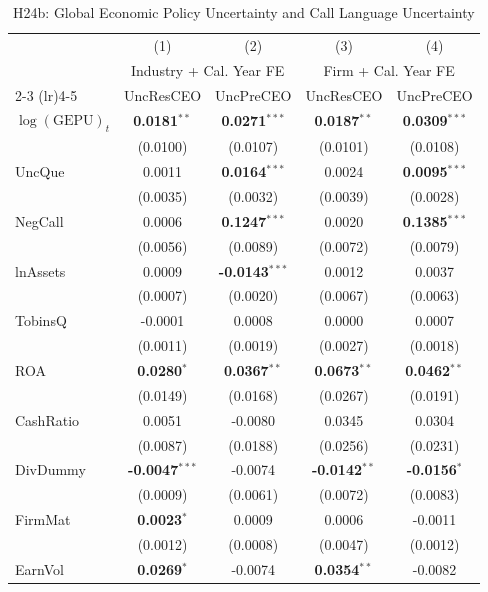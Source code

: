 \documentclass[11pt,a4paper]{article}
\begin{document}
\begin{table}[htbp]
\centering
\caption{H24b: Global Economic Policy Uncertainty and Call Language Uncertainty}
\label{tab:h24b_global_epu}
\scriptsize
\begin{tabular}{lcccc}
\toprule
 & (1) & (2) & (3) & (4) \\
 & \multicolumn{2}{c}{Industry + Cal. Year FE} & \multicolumn{2}{c}{Firm + Cal. Year FE} \\
\cmidrule(lr){2-3} \cmidrule(lr){4-5}
 & UncResCEO & UncPreCEO & UncResCEO & UncPreCEO \\
\midrule
$\log(\text{GEPU})_{t}$ & \textbf{0.0181}$^{**}$ & \textbf{0.0271}$^{***}$ & \textbf{0.0187}$^{**}$ & \textbf{0.0309}$^{***}$ \\
 & (0.0100) & (0.0107) & (0.0101) & (0.0108) \\
\midrule
UncQue & 0.0011 & \textbf{0.0164}$^{***}$ & 0.0024 & \textbf{0.0095}$^{***}$ \\
 & (0.0035) & (0.0032) & (0.0039) & (0.0028) \\
NegCall & 0.0006 & \textbf{0.1247}$^{***}$ & 0.0020 & \textbf{0.1385}$^{***}$ \\
 & (0.0056) & (0.0089) & (0.0072) & (0.0079) \\
lnAssets & 0.0009 & \textbf{-0.0143}$^{***}$ & 0.0012 & 0.0037 \\
 & (0.0007) & (0.0020) & (0.0067) & (0.0063) \\
TobinsQ & -0.0001 & 0.0008 & 0.0000 & 0.0007 \\
 & (0.0011) & (0.0019) & (0.0027) & (0.0018) \\
ROA & \textbf{0.0280}$^{*}$ & \textbf{0.0367}$^{**}$ & \textbf{0.0673}$^{**}$ & \textbf{0.0462}$^{**}$ \\
 & (0.0149) & (0.0168) & (0.0267) & (0.0191) \\
CashRatio & 0.0051 & -0.0080 & 0.0345 & 0.0304 \\
 & (0.0087) & (0.0188) & (0.0256) & (0.0231) \\
DivDummy & \textbf{-0.0047}$^{***}$ & -0.0074 & \textbf{-0.0142}$^{**}$ & \textbf{-0.0156}$^{*}$ \\
 & (0.0009) & (0.0061) & (0.0072) & (0.0083) \\
FirmMat & \textbf{0.0023}$^{*}$ & 0.0009 & 0.0006 & -0.0011 \\
 & (0.0012) & (0.0008) & (0.0047) & (0.0012) \\
EarnVol & \textbf{0.0269}$^{*}$ & -0.0074 & \textbf{0.0354}$^{**}$ & -0.0082 \\

\end{tabular}
\end{table}
\end{document}

